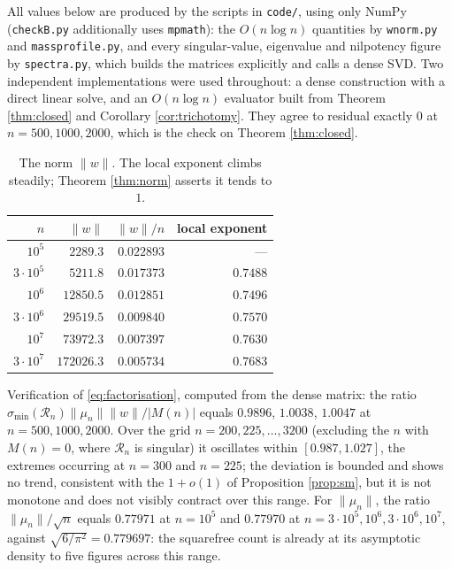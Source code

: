 \documentclass[11pt]{article}
\theoremstyle{definition}
\theoremstyle{remark}
\newcommand{\Rc}{\mathcal{R}}
\begin{document}
All values below are produced by the scripts in \texttt{code/}, using only NumPy
(\texttt{checkB.py} additionally uses \texttt{mpmath}): the $O(n\log n)$
quantities by \texttt{wnorm.py} and \texttt{massprofile.py}, and every
singular-value, eigenvalue and nilpotency figure by \texttt{spectra.py}, which
builds the matrices explicitly and calls a dense SVD. Two independent
implementations were used throughout: a dense construction with a direct linear
solve, and an $O(n\log n)$ evaluator built from Theorem \ref{thm:closed} and
Corollary \ref{cor:trichotomy}. They agree to residual exactly $0$ at
$n=500,1000,2000$, which is the check on Theorem \ref{thm:closed}.

\begin{table}[h]\centering
\begin{tabular}{rrrr}
\toprule
$n$ & $\|w\|$ & $\|w\|/n$ & local exponent \\
\midrule
$10^5$ & $2289.3$   & $0.022893$ & --- \\
$3\cdot10^5$ & $5211.8$   & $0.017373$ & $0.7488$ \\
$10^6$ & $12850.5$  & $0.012851$ & $0.7496$ \\
$3\cdot10^6$ & $29519.5$  & $0.009840$ & $0.7570$ \\
$10^7$ & $73972.3$  & $0.007397$ & $0.7630$ \\
$3\cdot10^7$ & $172026.3$ & $0.005734$ & $0.7683$ \\
\bottomrule
\end{tabular}
\caption{The norm $\|w\|$. The local exponent climbs steadily; Theorem
\ref{thm:norm} asserts it tends to $1$.}\label{tab:w}
\end{table}

Verification of \eqref{eq:factorisation}, computed from the dense matrix: the
ratio $\sigma_{\min}(\Rc_n)\|\mu_n\|\|w\|/|M(n)|$ equals $0.9896$, $1.0038$,
$1.0047$ at $n=500,1000,2000$. Over the grid $n=200,225,\dots,3200$ (excluding the
$n$ with $M(n)=0$, where $\Rc_n$ is singular) it oscillates within
$[0.987,1.027]$, the extremes occurring at $n=300$ and $n=225$; the deviation is
bounded and shows no trend, consistent with the $1+o(1)$ of Proposition
\ref{prop:sm}, but it is not monotone and does not visibly contract over this
range. For $\|\mu_n\|$, the ratio $\|\mu_n\|/\sqrt n$ equals $0.77971$ at $n=10^5$
and $0.77970$ at $n=3\cdot10^5,10^6,3\cdot10^6,10^7$, against
$\sqrt{6/\pi^2}=0.779697$: the squarefree count is already at its asymptotic
density to five figures across this range.
\end{document}

